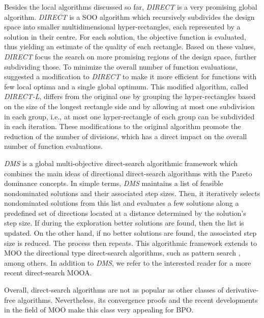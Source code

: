 	Besides the local algorithms discussed so far, \textit{\ac{DIRECT}} is a very promising global algorithm. \textit{\ac{DIRECT}} \cite{Jones1993DIRECT} is a \ac{SOO} algorithm which recursively subdivides the design space into smaller multidimensional hyper-rectangles, each represented by a solution in their centre. For each solution, the objective function is evaluated, thus yielding an estimate of the quality of each rectangle. Based on these values, \textit{\ac{DIRECT}} focus the search on more promising regions of the design space, further subdividing those. To minimize the overall number of function evaluations, \cite{Gablonsky2001} suggested a modification to \textit{\ac{DIRECT}} to make it more efficient for functions with few local optima and a single global optimum. This modified algorithm, called \textit{\ac{DIRECT}-L}, differs from the original one by grouping the hyper-rectangles based on the size of the longest rectangle side and by allowing at most one subdivision in each group, i.e., at most one hyper-rectangle of each group can be subdivided in each iteration. These modifications to the original algorithm promote the reduction of the number of divisions, which has a direct impact on the overall number of function evaluations.
	
	\textit{\ac{DMS}} \cite{Custodio2010} is a global multi-objective direct-search algorithmic framework which combines the main ideas of directional direct-search algorithms with the Pareto dominance concepts. In simple terms, \textit{\ac{DMS}} maintains a list of feasible nondominated solutions and their associated step sizes. Then, it iteratively selects nondominated solutions from this list and evaluates a few solutions along a predefined set of directions located at a distance determined by the solution's step size. If during the exploration better solutions are found, then the list is updated. On the other hand, if no better solutions are found, the associated step size is reduced. The process then repeats. This algorithmic framework extends to \ac{MOO} the directional type direct-search algorithms, such as pattern search \cite{Kolda2003}, among others. In addition to \textit{\ac{DMS}}, we refer \cite{Custodio2018} to the interested reader for a more recent direct-search \ac{MOOA}.
	
	Overall, direct-search algorithms are not as popular as other classes of derivative-free algorithms. Nevertheless, its convergence proofs and the recent developments in the field of \ac{MOO} make this class very appealing for \ac{BPO}. 
	
